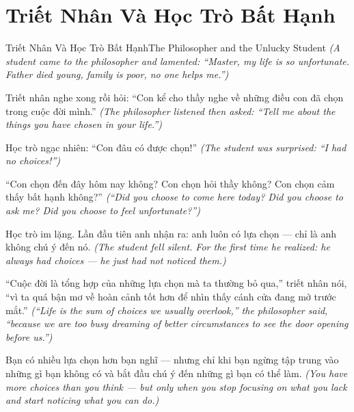\section{Triết Nhân Và Học Trò Bất Hạnh}
\begin{truyen}{Triết Nhân Và Học Trò Bất Hạnh}{The Philosopher and the Unlucky Student}
\textit{(A student came to the philosopher and lamented: ``Master, my life is so unfortunate. Father died young, family is poor, no one helps me.'')}

Triết nhân nghe xong rồi hỏi: ``Con kể cho thầy nghe về những điều con đã chọn trong cuộc đời mình.''
\textit{(The philosopher listened then asked: ``Tell me about the things you have chosen in your life.'')}

Học trò ngạc nhiên: ``Con đâu có được chọn!''
\textit{(The student was surprised: ``I had no choices!'')}

``Con chọn đến đây hôm nay không? Con chọn hỏi thầy không? Con chọn cảm thấy bất hạnh không?''
\textit{(``Did you choose to come here today? Did you choose to ask me? Did you choose to feel unfortunate?'')}

Học trò im lặng. Lần đầu tiên anh nhận ra: anh luôn có lựa chọn — chỉ là anh không chú ý đến nó.
\textit{(The student fell silent. For the first time he realized: he always had choices — he just had not noticed them.)}

``Cuộc đời là tổng hợp của những lựa chọn mà ta thường bỏ qua,'' triết nhân nói, ``vì ta quá bận mơ về hoàn cảnh tốt hơn để nhìn thấy cánh cửa đang mở trước mắt.''
\textit{(``Life is the sum of choices we usually overlook,'' the philosopher said, ``because we are too busy dreaming of better circumstances to see the door opening before us.'')}

\end{truyen}

\begin{baihoc}
Bạn có nhiều lựa chọn hơn bạn nghĩ — nhưng chỉ khi bạn ngừng tập trung vào những gì bạn không có và bắt đầu chú ý đến những gì bạn có thể làm.
\textit{(You have more choices than you think — but only when you stop focusing on what you lack and start noticing what you can do.)}
\end{baihoc}
\ngancach

